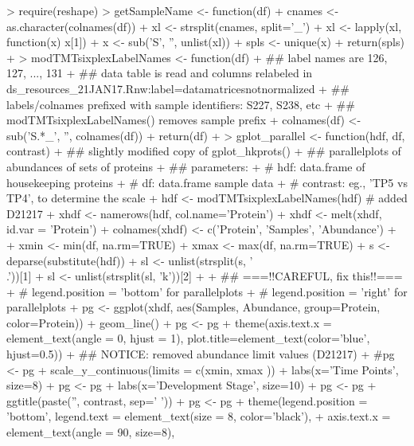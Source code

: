 \documentclass[a4paper]{article}
\begin{document}
\title{}
\author{}

\maketitle


\begin{Schunk}
\begin{Sinput}
> require(reshape)
> getSampleName <- function(df) {
+     cnames <- as.character(colnames(df))
+     xl <- strsplit(cnames, split='_')
+     xl <- lapply(xl, function(x) x[1])
+     x <- sub('S', '', unlist(xl))
+     spls <- unique(x)
+     return(spls)
+ }
> modTMTsixplexLabelNames <- function(df) {
+     ## label names are 126, 127, ..., 131
+     ## data table is read and columns relabeled in ds_resources_21JAN17.Rnw:label=datamatricesnotnormalized
+     ## labels/colnames prefixed with sample identifiers: S227, S238, etc
+     ## modTMTsixplexLabelNames() removes sample prefix
+     colnames(df) <- sub('S.*_', '', colnames(df))
+     return(df)
+ }
> gplot_parallel <- function(hdf, df, contrast) {
+     ## slightly modified copy of gplot_hkprots()
+     ## parallelplots of abundances of sets of proteins
+     ## parameters:
+     # hdf: data.frame of housekeeping proteins
+     # df: data.frame sample data
+     # contrast: eg., 'TP5 vs TP4', to determine the scale
+     hdf <- modTMTsixplexLabelNames(hdf) # added D21217
+     xhdf <- namerows(hdf, col.name='Protein')
+     xhdf <- melt(xhdf, id.var = 'Protein')
+     colnames(xhdf) <- c('Protein', 'Samples', 'Abundance')
+ 
+     xmin <- min(df, na.rm=TRUE)
+     xmax <- max(df, na.rm=TRUE)
+     s <- deparse(substitute(hdf))
+     sl <- unlist(strsplit(s, '\\.'))[1]
+     sl <- unlist(strsplit(sl, 'k'))[2]
+ 
+     ## ===!!CAREFUL, fix this!!===
+     # legend.position = 'bottom' for parallelplots
+     # legend.position = 'right' for parallelplots
+     pg <- ggplot(xhdf, aes(Samples, Abundance, group=Protein, color=Protein)) + geom_line()
+     pg <- pg + theme(axis.text.x = element_text(angle = 0, hjust = 1), plot.title=element_text(color='blue', hjust=0.5))
+     ## NOTICE: removed abundance limit values (D21217)
+     #pg <- pg + scale_y_continuous(limits = c(xmin, xmax )) + labs(x='Time Points', size=8)
+     pg <- pg + labs(x='Development Stage', size=10)
+     pg <- pg + ggtitle(paste('', contrast, sep=' ')) 
+     pg <- pg + theme(legend.position = 'bottom', legend.text = element_text(size = 8, color='black'),
+                      axis.text.x = element_text(angle = 90, size=8),
}
\end{Sinput}
\end{Schunk}
\end{document}
